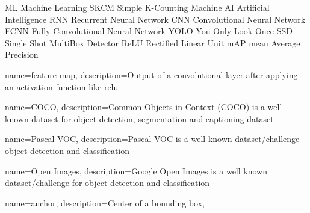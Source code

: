 
 {ML} {Machine Learning}
 {SKCM} {Simple K-Counting Machine}
 {AI} {Artificial Intelligence}
 {RNN} {Recurrent Neural Network}
 {CNN} {Convolutional Neural Network}
 {FCNN} {Fully Convolutional Neural Network}
 {YOLO} {You Only Look Once}
 {SSD} {Single Shot MultiBox Detector}
 {ReLU} {Rectified Linear Unit}
 {mAP} {mean Average Precision}



 {
    name={feature map},
    description={Output of a convolutional layer after applying an activation function like \gls{relu}}
}

 {
    name={COCO},
    description={Common Objects in Context (COCO) is a well known dataset for
    object detection, segmentation and captioning dataset}
}

 {
    name={Pascal VOC},
    description={Pascal VOC is a well known dataset/challenge object detection
    and classification}
}

 {
    name={Open Images},
    description={Google Open Images is a well known dataset/challenge for
    object detection and classification}
}

 {
    name={anchor},
    description={Center of a bounding box},
}


